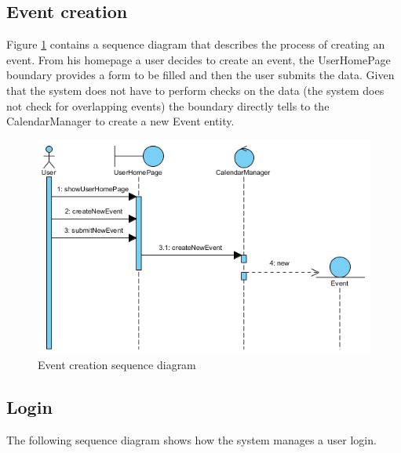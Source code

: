 \documentclass[10pt,a4paper,titlepage]{article}
\begin{document}
\subsection{Event creation}
Figure \ref{fig:createEvent_sequence} contains a sequence diagram that describes the process of creating an event. From his homepage a user decides to create an event, the UserHomePage boundary provides a form to be filled and then the user submits the data. Given that the system does not have to perform checks on the data (the system does not check for overlapping events) the boundary directly tells to the CalendarManager to create a new Event entity.
\begin{figure}[h!]
\centering
\includegraphics[width=\linewidth]{./images/createEvent_sequence}
\caption[Event creation sd]{Event creation sequence diagram}
\label{fig:createEvent_sequence}
\end{figure}

\clearpage
\subsection{Login}
The following sequence diagram shows how the system manages a user login.
\end{document}
